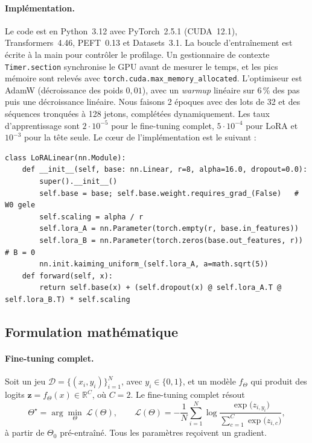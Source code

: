 \documentclass[11pt,a4paper]{article}
\newcommand{\R}{\mathbb{R}}
\begin{document}
\paragraph{Implémentation.} Le code est en Python~3.12 avec PyTorch~2.5.1 (CUDA~12.1), Transformers~4.46, PEFT~0.13 et Datasets~3.1. La boucle d'entraînement est écrite à la main pour contrôler le profilage. Un gestionnaire de contexte \texttt{Timer.section} synchronise le GPU avant de mesurer le temps, et les pics mémoire sont relevés avec \texttt{torch.cuda.max\_memory\_allocated}. L'optimiseur est AdamW (décroissance des poids $0{,}01$), avec un \emph{warmup} linéaire sur 6\,\% des pas puis une décroissance linéaire. Nous faisons 2 époques avec des lots de 32 et des séquences tronquées à 128 jetons, complétées dynamiquement. Les taux d'apprentissage sont $2\cdot10^{-5}$ pour le fine-tuning complet, $5\cdot10^{-4}$ pour LoRA et $10^{-3}$ pour la tête seule. Le cœur de l'implémentation est le suivant :
\begin{lstlisting}
class LoRALinear(nn.Module):
    def __init__(self, base: nn.Linear, r=8, alpha=16.0, dropout=0.0):
        super().__init__()
        self.base = base; self.base.weight.requires_grad_(False)   # W0 gele
        self.scaling = alpha / r
        self.lora_A = nn.Parameter(torch.empty(r, base.in_features))
        self.lora_B = nn.Parameter(torch.zeros(base.out_features, r))  # B = 0
        nn.init.kaiming_uniform_(self.lora_A, a=math.sqrt(5))
    def forward(self, x):
        return self.base(x) + (self.dropout(x) @ self.lora_A.T @ self.lora_B.T) * self.scaling
\end{lstlisting}

\subsection{Formulation mathématique}
\paragraph{Fine-tuning complet.} Soit un jeu $\mathcal{D}=\{(x_i,y_i)\}_{i=1}^N$, avec $y_i\in\{0,1\}$, et un modèle $f_\Theta$ qui produit des logits $\bm{z}=f_\Theta(x)\in\R^{C}$, où $C=2$. Le fine-tuning complet résout
\begin{equation}
\Theta^\star=\arg\min_{\Theta}\ \mathcal{L}(\Theta),\qquad
\mathcal{L}(\Theta)=-\frac{1}{N}\sum_{i=1}^{N}\log\frac{\exp\big(z_{i,y_i}\big)}{\sum_{c=1}^{C}\exp\big(z_{i,c}\big)} ,
\label{eq:ce}
\end{equation}
à partir de $\Theta_0$ pré-entraîné. Tous les paramètres reçoivent un gradient.
\end{document}
